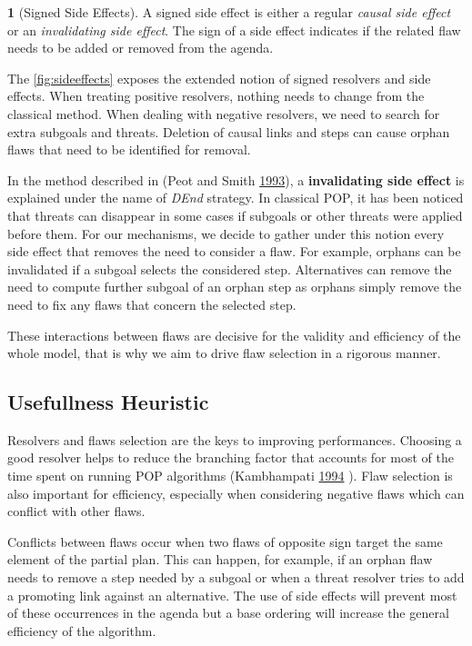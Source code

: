 \documentclass[11pt,a4paper,twoside,openright,titlepage,numbers=noenddot,headinclude,cleardoublepage=empty,openany]{scrreprt}
\theoremstyle{plain}
\theoremstyle{definition}
\newtheorem{definition}{\capitalisewords{definition}}[]
\theoremstyle{remark}
\begin{document}
\begin{definition}[Signed Side Effects]

A signed side effect is either a regular \emph{causal side effect} or an
\emph{invalidating side effect}. The sign of a side effect indicates if
the related flaw needs to be added or removed from the agenda.

\end{definition}

The \cref{fig:sideeffects} exposes the extended notion of signed
resolvers and side effects. When treating positive resolvers, nothing
needs to change from the classical method. When dealing with negative
resolvers, we need to search for extra subgoals and threats. Deletion of
causal links and steps can cause orphan flaws that need to be identified
for removal.

In the method described in (Peot and Smith
\protect\hyperlink{ref-peot_threatremoval_1993}{1993}), a
\textbf{invalidating side effect} is explained under the name of
\emph{DEnd} strategy. In classical POP, it has been noticed that threats
can disappear in some cases if subgoals or other threats were applied
before them. For our mechanisms, we decide to gather under this notion
every side effect that removes the need to consider a flaw. For example,
orphans can be invalidated if a subgoal selects the considered step.
Alternatives can remove the need to compute further subgoal of an orphan
step as orphans simply remove the need to fix any flaws that concern the
selected step.

These interactions between flaws are decisive for the validity and
efficiency of the whole model, that is why we aim to drive flaw
selection in a rigorous manner.

\hypertarget{usefullness-heuristic}{%
\subsection{Usefullness Heuristic}\label{usefullness-heuristic}}

Resolvers and flaws selection are the keys to improving performances.
Choosing a good resolver helps to reduce the branching factor that
accounts for most of the time spent on running POP algorithms
(Kambhampati \protect\hyperlink{ref-kambhampati_design_1994}{1994} ).
Flaw selection is also important for efficiency, especially when
considering negative flaws which can conflict with other flaws.

Conflicts between flaws occur when two flaws of opposite sign target the
same element of the partial plan. This can happen, for example, if an
orphan flaw needs to remove a step needed by a subgoal or when a threat
resolver tries to add a promoting link against an alternative. The use
of side effects will prevent most of these occurrences in the agenda but
a base ordering will increase the general efficiency of the algorithm.
\end{document}
